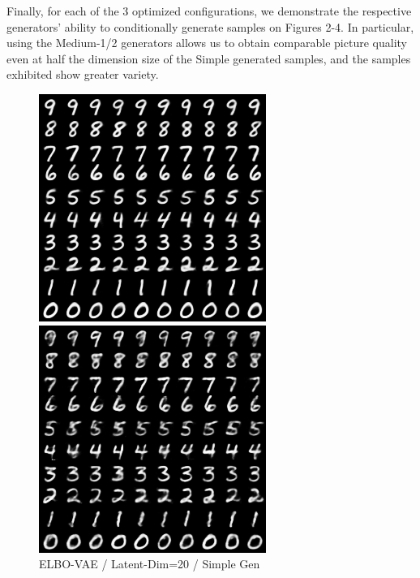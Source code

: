\documentclass{article}
\begin{document}
Finally, for each of the 3 optimized configurations, we demonstrate the respective generators' ability to conditionally generate samples on Figures 2-4. In particular, using the Medium-1/2 generators allows us to obtain comparable picture quality even at half the dimension size of the Simple generated samples, and the samples exhibited show greater variety.
\begin{figure}[htb]
  \includegraphics[width=\linewidth]{assets/elbo_20_simple.png}
  \caption{ELBO-VAE / Latent-Dim=20 / Simple Gen}\label{fig:elbo_20_simple}
\endminipage\hfill
{}
   \includegraphics[width=\linewidth]{assets/mmd_20_simple.png}

\end{figure}
\end{document}
